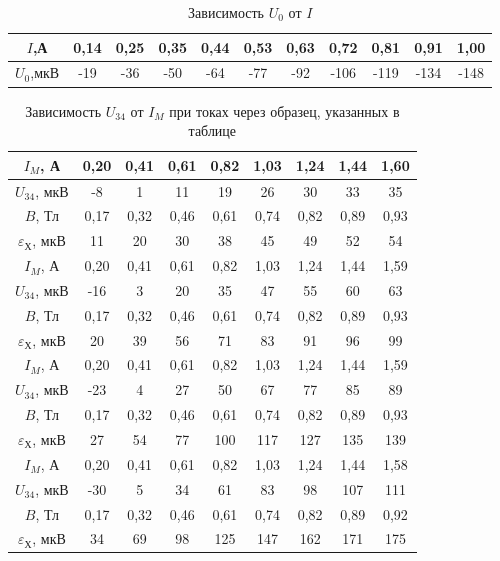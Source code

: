 \documentclass[a4paper,10pt]{article}
\begin{document}
\begin{table}[h]
	\centering
	\caption{Зависимость $U_0$ от $I$} \label{hol}
	\begin{tabular}{|c|c|c|c|c|c|c|c|c|c|c|}
		\hline
		$I$,А&0,14&0,25&0,35&0,44&0,53&0,63&0,72&0,81&0,91&1,00\\ \hline
		$U_0$,мкВ&-19&-36&-50&-64&-77&-92&-106&-119&-134&-148\\ \hline
	\end{tabular}
\end{table}

\begin{table}
	\centering
	\caption{Зависимость $U_{34}$ от $I_M$ при токах через образец, указанных в таблице } \label{holl}
	\begin{tabular}{|c|c|c|c|c|c|c|c|c|}
		\hline
		$I_M$, А & 0,20 & 0,41 & 0,61 & 0,82 & 1,03 & 1,24 & 1,44 & 1,60 \\ \hline
		$U_{34}$, мкВ & -8 & 1 & 11 & 19 & 26 & 30 & 33 & 35 \\ \hline
		$B$, Тл & 0,17 & 0,32 & 0,46 & 0,61 & 0,74 & 0,82 & 0,89 & 0,93 \\ \hline
		$\varepsilon_{\text{Х}}$, мкВ & 11 & 20 & 30 & 38 & 45 & 49 & 52 & 54 \\ \hline
		\hline
		$I_M$, А & 0,20 & 0,41 & 0,61 & 0,82 & 1,03 & 1,24 & 1,44 & 1,59 \\ \hline
		$U_{34}$, мкВ & -16 & 3 & 20 & 35 & 47 & 55 & 60 & 63 \\ \hline
		$B$, Тл & 0,17 & 0,32 & 0,46 & 0,61 & 0,74 & 0,82 & 0,89 & 0,93 \\ \hline
		$\varepsilon_{\text{Х}}$, мкВ & 20 & 39 & 56 & 71 & 83 & 91 & 96 & 99 \\ \hline
		\hline
		$I_M$, А & 0,20 & 0,41 & 0,61 & 0,82 & 1,03 & 1,24 & 1,44 & 1,59 \\ \hline
		$U_{34}$, мкВ & -23 & 4 & 27 & 50 & 67 & 77 & 85 & 89 \\ \hline
		$B$, Тл & 0,17 & 0,32 & 0,46 & 0,61 & 0,74 & 0,82 & 0,89 & 0,93 \\ \hline
		$\varepsilon_{\text{Х}}$, мкВ & 27 & 54 & 77 & 100 & 117 & 127 & 135 & 139 \\ \hline
		\hline
		$I_M$, А & 0,20 & 0,41 & 0,61 & 0,82 & 1,03 & 1,24 & 1,44 & 1,58 \\ \hline
		$U_{34}$, мкВ & -30 & 5 & 34 & 61 & 83 & 98 & 107 & 111 \\ \hline
		$B$, Тл & 0,17 & 0,32 & 0,46 & 0,61 & 0,74 & 0,82 & 0,89 & 0,92 \\ \hline
		$\varepsilon_{\text{Х}}$, мкВ & 34 & 69 & 98 & 125 & 147 & 162 & 171 & 175 \\ \hline

\end{tabular}
\end{table}
\end{document}
